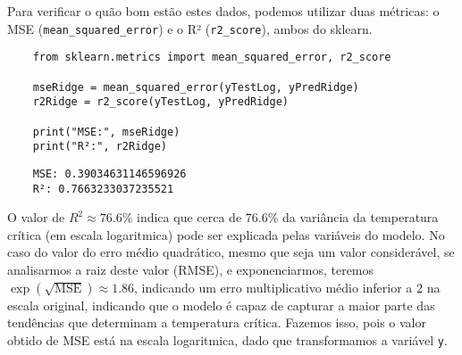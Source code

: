 Para verificar o quão bom estão estes dados, podemos utilizar duas métricas: o MSE (\verb|mean_squared_error|) e o R² (\verb|r2_score|), ambos do sklearn.
\begin{longlisting}
    \begin{verbatim}
    from sklearn.metrics import mean_squared_error, r2_score

    mseRidge = mean_squared_error(yTestLog, yPredRidge)
    r2Ridge = r2_score(yTestLog, yPredRidge)

    print("MSE:", mseRidge)
    print("R²:", r2Ridge)
    \end{verbatim}
\end{longlisting}
\begin{verbatim}
    MSE: 0.39034631146596926
    R²: 0.7663233037235521
\end{verbatim}

O valor de $R^{2} \approx 76.6\%$ indica que cerca de $76.6\%$ da variância da temperatura crítica (em escala logaritmica) pode ser explicada pelas variáveis do modelo. No caso do valor do erro médio quadrático, mesmo que seja um valor considerável, se analisarmos a raiz deste valor (RMSE), e exponenciarmos, teremos $\exp(\sqrt{\text{MSE}}) \approx 1.86$, indicando um erro multiplicativo médio inferior a $2$ na escala original, indicando que o modelo é capaz de capturar a maior parte das tendências que determinam a temperatura crítica. Fazemos isso, pois o valor obtido de MSE está na escala logaritmica, dado que transformamos a variável \verb|y|.